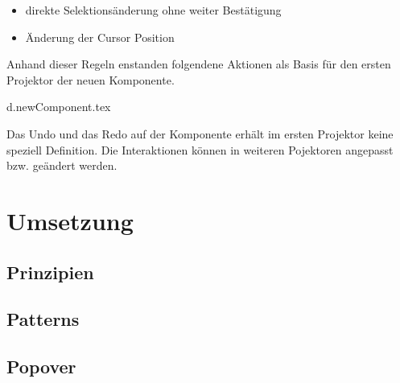 \begin{itemize}
    \item direkte Selektionsänderung ohne weiter Bestätigung
    \item Änderung der Cursor Position
\end{itemize}

\noindent
Anhand dieser Regeln enstanden folgendene Aktionen als Basis für den ersten Projektor der neuen Komponente. 


\clearpage
{d.newComponent.tex}

Das Undo und das Redo auf der Komponente erhält im ersten Projektor keine speziell Definition.
Die Interaktionen können in weiteren Pojektoren angepasst bzw. geändert werden.



\section{Umsetzung}



\subsection{Prinzipien}



\subsection{Patterns}



\subsection{Popover}


